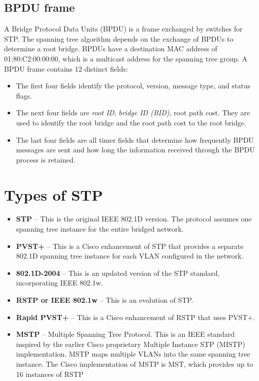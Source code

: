 \subsection{BPDU frame}
A Bridge Protocol Data Units (BPDU) is a frame exchanged by switches for STP. The spanning tree algorithm depends on the exchange of BPDUs to determine a root bridge. BPDUs have a destination MAC address of 01:80:C2:00:00:00, which is a multicast address for the spanning tree group.  A BPDU frame contains 12 distinct fields:
\begin{itemize}
\item The first four fields identify the protocol, version, message type, and status flags.
\item The next four fields are \textit{root ID}, \textit{bridge ID (BID)}, root path cost. They are  used to identify the root bridge and the root path cost to the root bridge.
\item The last four fields are all timer fields that determine how frequently BPDU messages are sent and how long the information received through the BPDU process is retained.
\end{itemize}
\section{Types of STP}
\begin{itemize}
\item \textbf{STP} -- This is the original IEEE 802.1D version. The protocol assumes one spanning tree instance for the entire bridged network.
\item \textbf{PVST+} -- This is a Cisco enhancement of STP that provides a separate 802.1D spanning tree instance for each VLAN configured in the network.
\item \textbf{802.1D-2004} -- This is an updated version of the STP standard, incorporating IEEE 802.1w.
\item \textbf{RSTP or IEEE 802.1w} -- This is an evolution of STP.
\item \textbf{Rapid PVST+} -- This is a Cisco enhancement of RSTP that uses PVST+.
\item \textbf{MSTP} -- Multiple Spanning Tree Protocol. This is an IEEE standard inspired by the earlier Cisco proprietary Multiple Instance STP (MISTP) implementation. MSTP maps multiple VLANs into the same spanning tree instance. The Cisco implementation of MSTP is MST, which provides up to 16 instances of RSTP
\end{itemize}
